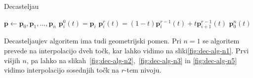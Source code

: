 \documentclass[isrm2, tisk]{fmfdelo}
\newcommand{\p}{\textbf{p}}
\begin{document}
    \begin{algorithm}
        \label{alg:decasteljau}
        \caption{Decasteljau}
        \begin{algorithmic}
            \State $\p \gets \p_0,\p_1,\dots,\p_n$
                \State $\p_i^0(t)=\p_i$
            \EndFor
                    \State $\p_i^r(t)=(1-t)\p_i^{r-1}(t)+t\p_{i+1}^{r-1}(t)$
                \EndFor
            \EndFor
            \State \Return $\p_0^n(t)$
        \end{algorithmic}
    \end{algorithm}
    Decasteljaujev algoritem ima tudi geometrijski pomen.
    Pri $n=1$ se algoritem prevede na interpolacijo dveh točk, kar lahko vidimo na sliki\ref{fig:dec-alg-n1}.
    Prvi višjih $n$, pa lahko na slikah~\ref{fig:dec-alg-n2},~\ref{fig:dec-alg-n3} in \ref{fig:dec-alg-n5} vidimo interpolacijo sosednjih točk na $r$-tem nivoju.
\end{document}
